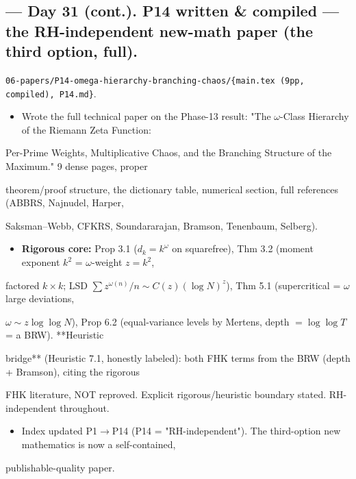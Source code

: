 \documentclass[10pt]{article}
\begin{document}
\subsection*{ --- Day 31 (cont.). P14 written \& compiled --- the RH-independent new-math paper (the third option, full).}
\texttt{06-papers/P14-omega-hierarchy-branching-chaos/\{main.tex (9pp, compiled), P14.md\}}.\par
\begin{itemize}
\item Wrote the full technical paper on the Phase-13 result: "The \ensuremath{\omega}-Class Hierarchy of the Riemann Zeta Function:
\end{itemize}
  Per-Prime Weights, Multiplicative Chaos, and the Branching Structure of the Maximum." 9 dense pages, proper\par
  theorem/proof structure, the dictionary table, numerical section, full references (ABBRS, Najnudel, Harper,\par
  Saksman--Webb, CFKRS, Soundararajan, Bramson, Tenenbaum, Selberg).\par
\begin{itemize}
\item \textbf{Rigorous core:} Prop 3.1 ($d_k=k^\omega$ on squarefree), Thm 3.2 (moment exponent $k^2$ = \ensuremath{\omega}-weight $z=k^2$,
\end{itemize}
  factored $k\times k$; LSD $\sum z^{\omega(n)}/n\sim C(z)(\log N)^z$), Thm 5.1 (supercritical = \ensuremath{\omega} large deviations,\par
  $\omega\sim z\log\log N$), Prop 6.2 (equal-variance levels by Mertens, depth $=\log\log T$ = a BRW). **Heuristic\par
  bridge** (Heuristic 7.1, honestly labeled): both FHK terms from the BRW (depth + Bramson), citing the rigorous\par
  FHK literature, NOT reproved. Explicit rigorous/heuristic boundary stated. RH-independent throughout.\par
\begin{itemize}
\item Index updated P1\ensuremath{\to}P14 (P14 = "RH-independent"). The third-option new mathematics is now a self-contained,
\end{itemize}
  publishable-quality paper.\par
\end{document}

